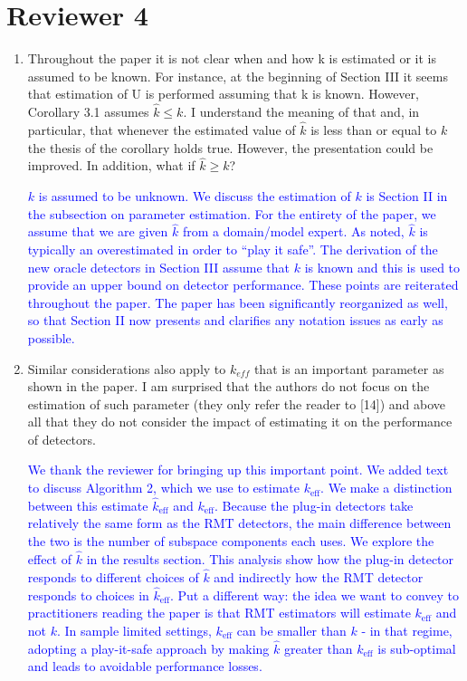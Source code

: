 \documentclass[11pt]{article}
\begin{document}
\section*{Reviewer 4}
\begin{enumerate}
\item Throughout the paper it is not clear when and how k is estimated or it is assumed to be known. For instance, at the beginning of Section III it seems that estimation of U is performed assuming that k is known. However, Corollary 3.1 assumes $\hat{k} \leq  k$. I understand the meaning of that and, in particular, that whenever the estimated value of $\hat{k}$ is less than or equal to $k$ the thesis of the corollary holds true. However, the presentation could be improved. In addition, what if $\hat{k} \ge  k$?

\textcolor{blue}{$k$ is assumed to be unknown. We discuss the estimation of $k$ is Section II in the subsection on parameter estimation. For the entirety of the paper, we assume that we are given $\widehat{k}$ from a domain/model expert. As noted, $\widehat{k}$ is typically an overestimated in order to ``play it safe''. The derivation of the new oracle detectors in Section III assume that $k$ is known and this is used to provide an upper bound on detector performance. These points are reiterated throughout the paper. The paper has been significantly reorganized as well, so that Section II now presents and clarifies any notation issues as early as possible.}

\item Similar considerations also apply to $k_{eff}$ that is an important parameter as shown in the paper. I am surprised that the authors do not focus on the estimation of such parameter (they only refer the reader to [14]) and above all that they do not consider the impact of estimating it on the performance of detectors.

\textcolor{blue}{We thank the reviewer for bringing up this important point. We added text to discuss Algorithm 2, which we use to estimate $k_{\text{eff}}$. We make a distinction between this estimate $\widehat{k}_{\text{eff}}$ and $k_{\text{eff}}$. Because the plug-in detectors take relatively the same form as the RMT detectors, the main difference between the two is the number of subspace components each uses. We explore the effect of $\widehat{k}$ in the results section. This analysis show how the plug-in detector responds to different choices of $\widehat{k}$ and indirectly how the RMT detector responds to choices in $\widehat{k}_{\text{eff}}$. Put a different way: the idea we want to convey to practitioners reading the paper is that RMT estimators will estimate $k_{\text{eff}}$ and not $k$. In sample limited settings, $k_{\text{eff}}$ can be smaller than $k$ - in that regime, adopting a play-it-safe approach by making $\widehat{k}$ greater than $k_{\text{eff}}$ is sub-optimal and leads to avoidable performance losses. }


\end{enumerate}
\end{document}
